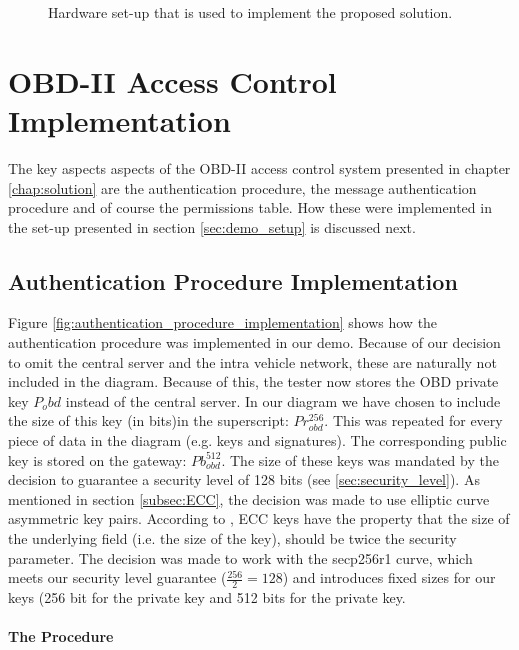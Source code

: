 \begin{figure}[h]
	\label{fig:demo}
	\caption{Hardware set-up that is used to implement the proposed solution.}
\end{figure}

\section{OBD-II Access Control Implementation}
The key aspects aspects of the OBD-II access control system presented in chapter \ref{chap:solution} are the authentication procedure, the message authentication procedure and of course the permissions table. How these were implemented in the set-up presented in section \ref{sec:demo_setup} is discussed next. 

\subsection{Authentication Procedure Implementation}
\label{sec:authentication_procedure_implementation}

Figure \ref{fig:authentication_procedure_implementation} shows how the authentication procedure was implemented in our demo. Because of our decision to omit the central server and the intra vehicle network, these are naturally not included in the diagram. Because of this, the tester now stores the OBD private key $P_obd$ instead of the central server. In our diagram we have chosen to include the size of this key (in bits)in the superscript: $Pr_{obd}^{256}$. This was repeated for every piece of data in the diagram (e.g. keys and signatures). The corresponding public key is stored on the gateway: $Pb_{obd}^{512}$. The size of these keys was mandated by the decision to guarantee a security level of 128 bits (see \ref{sec:security_level}). As mentioned in section \ref{subsec:ECC}, the decision was made to use elliptic curve asymmetric key pairs. According to \cite{wiki:ECC}, ECC keys have the property that the size of the underlying field (i.e. the size of the key), should be twice the security parameter. The decision was made to work with the secp256r1 curve, which meets our security level guarantee ($\frac{256}{2}=128$) and introduces fixed sizes for our keys (256 bit for the private key and 512 bits for the private key.

\paragraph{The Procedure}

